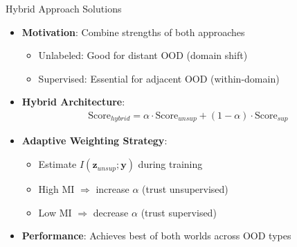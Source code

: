 \documentclass[aspectratio=169]{beamer}
\begin{document}
\begin{frame}{Hybrid Approach Solutions}
\begin{itemize}
    \item \textbf{Motivation}: Combine strengths of both approaches
    \begin{itemize}
        \item Unlabeled: Good for distant OOD (domain shift)
        \item Supervised: Essential for adjacent OOD (within-domain)
    \end{itemize}
    \item \textbf{Hybrid Architecture}:
    \begin{align}
        \text{Score}_{hybrid} = \alpha \cdot \text{Score}_{unsup} + (1-\alpha) \cdot \text{Score}_{sup}
    \end{align}
    \item \textbf{Adaptive Weighting Strategy}:
    \begin{itemize}
        \item Estimate $I(\mathbf{z}_{unsup}; \mathbf{y})$ during training
        \item High MI $\Rightarrow$ increase $\alpha$ (trust unsupervised)
        \item Low MI $\Rightarrow$ decrease $\alpha$ (trust supervised)
    \end{itemize}
    \item \textbf{Performance}: Achieves best of both worlds across OOD types
\end{itemize}
\end{frame}
\end{document}
